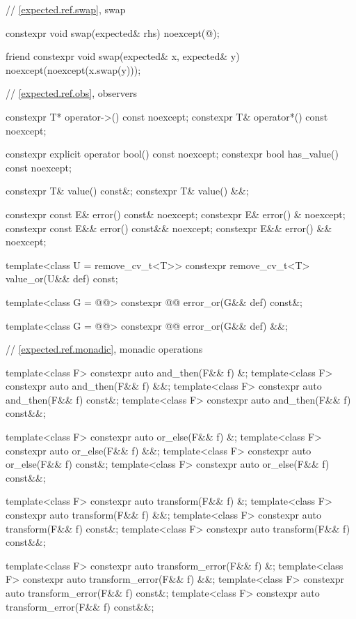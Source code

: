\begin{codeblock}
{{    // \ref{expected.ref.swap}, swap

    constexpr void swap(expected& rhs) noexcept(@\seebelow@);

    friend constexpr void swap(expected& x, expected& y) noexcept(noexcept(x.swap(y)));

    // \ref{expected.ref.obs}, observers

    constexpr T* operator->() const noexcept;
    constexpr T& operator*() const noexcept;

    constexpr explicit operator bool() const noexcept;
    constexpr bool has_value() const noexcept;

    constexpr T& value() const&;
    constexpr T& value() &&;

    constexpr const E& error() const& noexcept;
    constexpr E& error() & noexcept;
    constexpr const E&& error() const&& noexcept;
    constexpr E&& error() && noexcept;

    template<class U = remove_cv_t<T>> constexpr remove_cv_t<T> value_or(U&& def) const;

    template<class G = @@>
    constexpr @@ error_or(G&& def) const&;

    template<class G = @@>
    constexpr @@ error_or(G&& def) &&;

    // \ref{expected.ref.monadic}, monadic operations

    template<class F> constexpr auto and_then(F&& f) &;
    template<class F> constexpr auto and_then(F&& f) &&;
    template<class F> constexpr auto and_then(F&& f) const&;
    template<class F> constexpr auto and_then(F&& f) const&&;

    template<class F> constexpr auto or_else(F&& f) &;
    template<class F> constexpr auto or_else(F&& f) &&;
    template<class F> constexpr auto or_else(F&& f) const&;
    template<class F> constexpr auto or_else(F&& f) const&&;

    template<class F> constexpr auto transform(F&& f) &;
    template<class F> constexpr auto transform(F&& f) &&;
    template<class F> constexpr auto transform(F&& f) const&;
    template<class F> constexpr auto transform(F&& f) const&&;

    template<class F> constexpr auto transform_error(F&& f) &;
    template<class F> constexpr auto transform_error(F&& f) &&;
    template<class F> constexpr auto transform_error(F&& f) const&;
    template<class F> constexpr auto transform_error(F&& f) const&&;

}}
\end{codeblock}
